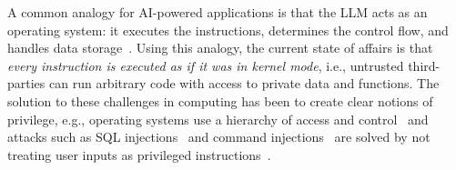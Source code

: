 \begin{tcolorbox}[left=1mm, right=1.5mm, top=1.5mm, bottom=1mm]
\end{tcolorbox}


A common analogy for AI-powered applications is that the LLM acts as an operating system: it executes the instructions, determines the control flow, and handles data storage~\citep{weng2023agent,shen2024hugginggpt}. Using this analogy, the current state of affairs is that \emph{every instruction is executed as if it was in kernel mode}, i.e., untrusted third-parties can run arbitrary code with access to private data and functions. The solution to these challenges in computing has been to create clear notions of privilege, e.g., operating systems use a hierarchy of access and control~\citep{corbato1965introduction,unix} and attacks such as SQL injections~\citep{Su2006TheEO} and command injections~\citep{zhong2024command} are solved by not treating user inputs as privileged instructions~\citep{THOMAS2009589}.


